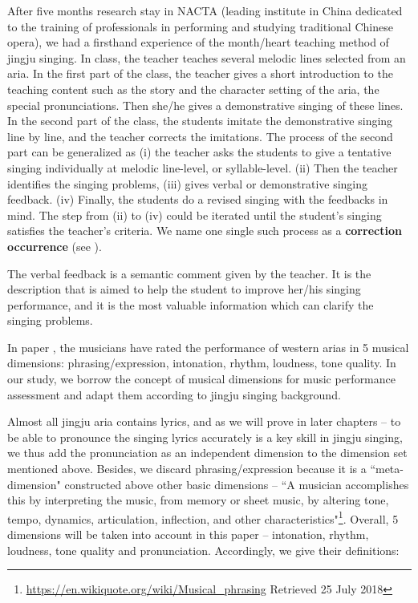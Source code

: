 After five months research stay in \gls{NACTA} (leading institute in China dedicated to the training of professionals in performing and studying traditional Chinese opera), we had a firsthand experience of the month/heart teaching method of jingju singing. In class, the teacher teaches several melodic lines selected from an aria. In the first part of the class, the teacher gives a short introduction to the teaching content such as the story and the character setting of the aria, the special pronunciations. Then she/he gives a demonstrative singing of these lines. In the second part of the class, the students imitate the demonstrative singing line by line, and the teacher corrects the imitations. The process of the second part can be generalized as (i) the teacher asks the students to give a tentative singing individually at melodic line-level, or syllable-level. (ii) Then the teacher identifies the singing problems, (iii) gives verbal or demonstrative singing feedback. (iv) Finally, the students do a revised singing with the feedbacks in mind. The step from (ii) to (iv) could be iterated until the student's singing satisfies the teacher's criteria. We name one single such process as a \textbf{correction occurrence} (see ).

The verbal feedback is a semantic comment given by the teacher. It is the description that is aimed to help the student to improve her/his singing performance, and it is the most valuable information which can clarify the singing problems.

In paper \cite{geringer_musicians_1998}, the musicians have rated the performance of western arias in 5 musical dimensions: phrasing/expression, intonation, rhythm, loudness, tone quality. In our study, we borrow the concept of musical dimensions for music performance assessment and adapt them according to jingju singing background. 

Almost all jingju aria contains lyrics, and as we will prove in later chapters -- to be able to pronounce the singing lyrics accurately is a key skill in jingju singing, we thus add the pronunciation as an independent dimension to the dimension set mentioned above. Besides, we discard phrasing/expression because it is a ``meta-dimension" constructed above other basic dimensions -- ``A musician accomplishes this by interpreting the music, from memory or sheet music, by altering tone, tempo, dynamics, articulation, inflection, and other characteristics"\footnote{\url{https://en.wikiquote.org/wiki/Musical_phrasing} Retrieved 25 July 2018}. Overall, 5 dimensions will be taken into account in this paper -- intonation, rhythm, loudness, tone quality and pronunciation. Accordingly, we give their definitions:

